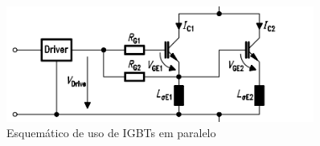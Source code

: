 \begin{figure}[!htb]
    \centering
    \includegraphics[width=0.9\textwidth]{./dados/figuras/paralleligbt}
    \caption{Esquemático de uso de IGBTs em paralelo}
    \label{fig:figura-paralleligbt}
\end{figure}

